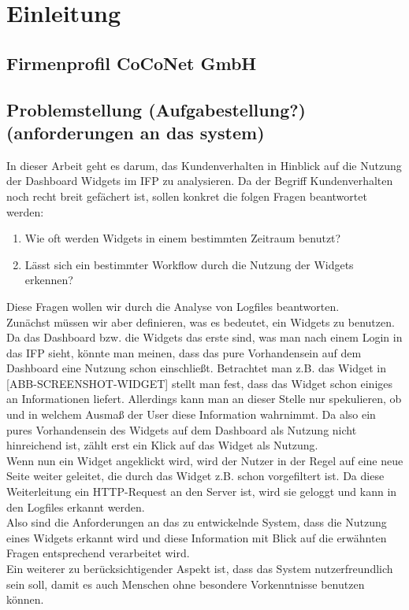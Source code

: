 \section{Einleitung}\raggedbottom
\label{sec:Einleutung}

\subsection{Firmenprofil CoCoNet GmbH}
\label{sub:Firmenprofil CoCoNet GmbH}

\subsection{Problemstellung (Aufgabestellung?) (anforderungen an das system)}
\label{sub:Problemstellung}
In dieser Arbeit geht es darum, das Kundenverhalten in Hinblick auf die Nutzung der Dashboard Widgets im IFP zu analysieren. Da der Begriff Kundenverhalten noch recht breit gefächert ist, sollen konkret die folgen Fragen beantwortet werden:
\begin{enumerate}
	\item Wie oft werden Widgets in einem bestimmten Zeitraum benutzt?\\
	\item Lässt sich ein bestimmter Workflow durch die Nutzung der Widgets erkennen?\\
\end{enumerate}
Diese Fragen wollen wir durch die Analyse von Logfiles beantworten.\\
Zunächst müssen wir aber definieren, was es bedeutet, ein Widgets zu benutzen. Da das Dashboard bzw. die Widgets das erste sind, was man nach einem Login in das IFP sieht, könnte man meinen, dass das pure Vorhandensein auf dem Dashboard eine Nutzung schon einschließt. Betrachtet man z.B. das Widget in [ABB-SCREENSHOT-WIDGET] stellt man fest, dass das Widget schon einiges an Informationen liefert. Allerdings kann man an dieser Stelle nur spekulieren, ob und in welchem Ausmaß der User diese Information wahrnimmt. Da also ein pures Vorhandensein des Widgets auf dem Dashboard als Nutzung nicht hinreichend ist, zählt erst ein Klick auf das Widget als Nutzung.\\
Wenn nun ein Widget angeklickt wird, wird der Nutzer in der Regel auf eine neue Seite weiter geleitet, die durch das Widget z.B. schon vorgefiltert ist. Da diese Weiterleitung ein HTTP-Request an den Server ist, wird sie geloggt und kann in den Logfiles erkannt werden.\\
Also sind die Anforderungen an das zu entwickelnde System, dass die Nutzung eines Widgets erkannt wird und diese Information mit Blick auf die erwähnten Fragen entsprechend verarbeitet wird.\\
Ein weiterer zu berücksichtigender Aspekt ist, dass das System nutzerfreundlich sein soll, damit es auch Menschen ohne besondere Vorkenntnisse benutzen können.

